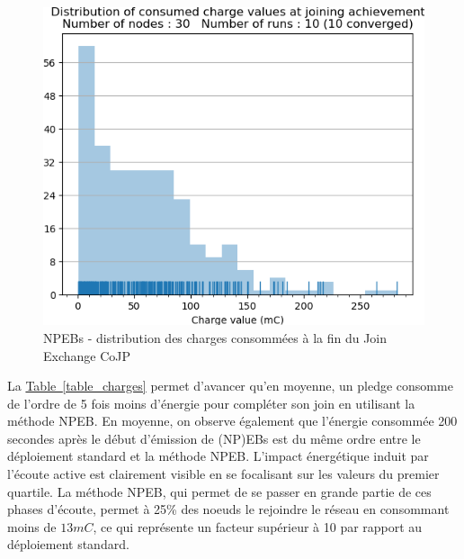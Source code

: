 \documentclass[]{report}
\newcommand{\wordlink}[2]{\hyperref[#2]{#1~\ref{#2}}}
\begin{document}
\begin{figure}[!ht]
\begin{minipage}{0.5\textwidth}
		\includegraphics[width=\textwidth]{results/NPEB/chargejoined.hist}
		\caption{NPEBs - distribution des charges consommées à la fin du Join Exchange CoJP}
		\label{fig:NPEBchargesjoined}
	\end{minipage}	
\end{figure}

La \wordlink{Table}{table_charges} permet d'avancer qu'en moyenne, un pledge consomme de l'ordre de 5 fois moins d'énergie pour compléter son join en utilisant la méthode NPEB. En moyenne, on observe également que l'énergie consommée 200 secondes après le début d'émission de (NP)EBs est du même ordre entre le déploiement standard et la méthode NPEB. L'impact énergétique induit par l'écoute active est clairement visible en se focalisant sur les valeurs du premier quartile. La méthode NPEB, qui permet de se passer en grande partie de ces phases d'écoute, permet à 25\% des noeuds le rejoindre le réseau en consommant moins de $13 mC$, ce qui représente un facteur supérieur à 10 par rapport au déploiement standard.
\end{document}
